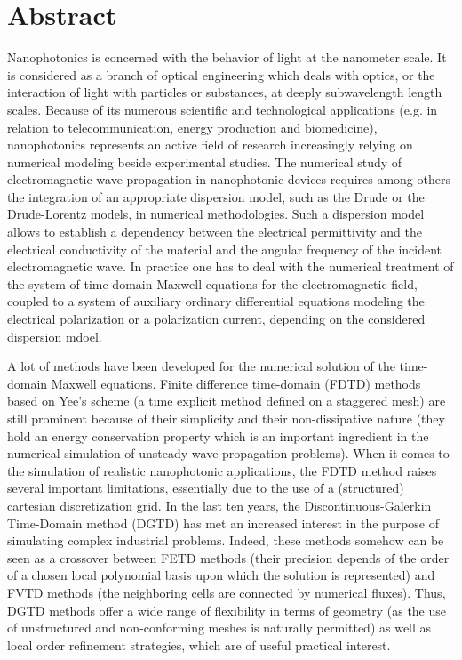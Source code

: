 \documentclass[article,A4,11pt]{llncs}%
\begin{document}
\section*{Abstract}
Nanophotonics is concerned with the behavior of light at the nanometer
scale.   It is  considered as  a branch  of optical  engineering which
deals  with optics,  or the  interaction  of light  with particles  or
substances,  at deeply  subwavelength length  scales.  Because  of its
numerous scientific and  technological applications (e.g.  in relation
to    telecommunication,   energy    production    and   biomedicine),
nanophotonics  represents  an active  field  of research  increasingly
relying  on  numerical  modeling  beside  experimental  studies.   The
numerical  study of electromagnetic  wave propagation  in nanophotonic
devices  requires  among  others  the integration  of  an  appropriate
dispersion model,  such as the  Drude or the Drude-Lorentz  models, in
numerical methodologies.  Such a  dispersion model allows to establish
a dependency  between the  electrical permittivity and  the electrical
conductivity of the material and the angular frequency of the incident
electromagnetic wave.  In practice one  has to deal with the numerical
treatment  of the  system  of time-domain  Maxwell  equations for  the
electromagnetic  field,  coupled to  a  system  of auxiliary  ordinary
differential  equations  modeling  the  electrical polarization  or  a
polarization current, depending on the considered dispersion mdoel.

A lot of methods have been developed for the numerical solution of the
time-domain Maxwell  equations.  Finite difference  time-domain (FDTD)
methods based  on Yee's  scheme (a time  explicit method defined  on a
staggered mesh)  are still prominent  because of their  simplicity and
their  non-dissipative  nature   (they  hold  an  energy  conservation
property which is an  important ingredient in the numerical simulation
of  unsteady  wave  propagation  problems).   When  it  comes  to  the
simulation  of realistic  nanophotonic applications,  the  FDTD method
raises several important limitations, essentially  due to the use of a
(structured) cartesian  discretization grid.   In the last  ten years,
the  Discontinuous-Galerkin  Time-Domain  method  (DGTD)  has  met  an
increased  interest in  the purpose  of simulating  complex industrial
problems.  Indeed,  these methods somehow  can be seen as  a crossover
between FETD methods (their precision depends of the order of a chosen
local  polynomial basis upon  which the  solution is  represented) and
FVTD  methods  (the  neighboring  cells  are  connected  by  numerical
fluxes).   Thus, DGTD  methods offer  a wide  range of  flexibility in
terms  of geometry  (as  the use  of  unstructured and  non-conforming
meshes  is naturally  permitted)  as well  as  local order  refinement
strategies, which are of useful practical interest.
\end{document}
